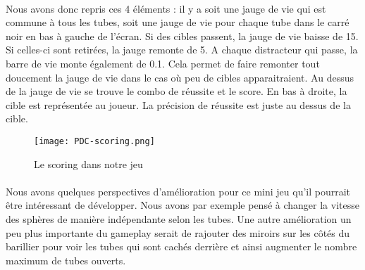 \paragraph{}Nous avons donc repris ces 4 éléments : il y a soit une jauge de vie qui est commune à tous les tubes, soit une jauge de vie pour chaque tube dans le carré noir en bas à
gauche de l'écran. Si des cibles passent, la jauge de vie baisse de 15. Si celles-ci sont retirées, la jauge remonte de 5. A chaque distracteur qui passe, la barre de vie monte
également de 0.1. Cela permet de faire remonter tout doucement la jauge de vie dans le cas où peu de cibles apparaitraient. Au dessus de la jauge de vie se trouve le combo de réussite
et le score. En bas à droite, la cible est représentée au joueur. La précision de réussite est juste au dessus de la cible.

\begin{figure}[H]
    \begin{center}
    \texttt{[image: PDC-scoring.png]}
    \end{center}
    \caption{Le scoring dans notre jeu}
\label{ScoringPDCInspiration}
\end{figure}

\paragraph{}Nous avons quelques perspectives d'amélioration pour ce mini jeu qu'il pourrait être intéressant de développer. Nous avons par exemple pensé à changer la vitesse des
sphères de manière indépendante selon les tubes. Une autre amélioration un peu plus importante du gameplay serait de rajouter des miroirs sur les côtés du barillier pour voir les
tubes qui sont cachés derrière et ainsi augmenter le nombre maximum de tubes ouverts.

\label{prototypage}